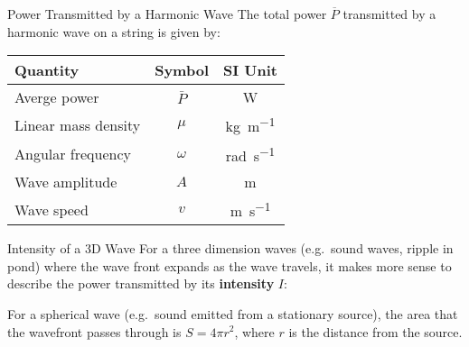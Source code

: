 \documentclass[12pt,aspectratio=169]{beamer}
\newcommand{\eq}[2]{\vspace{#1}{\Large\begin{displaymath}#2\end{displaymath}}}
\begin{document}
\begin{frame}{Power Transmitted by a Harmonic Wave}
  The total power $\overline{P}$ transmitted by a harmonic wave on a string is
  given by:

  \eq{-.2in}{
    \boxed{\overline{P}=\frac12\mu\omega^2A^2v}
  }
  \begin{center}
    \begin{tabular}{l|c|c}
      \rowcolor{pink}
      \textbf{Quantity} & \textbf{Symbol} & \textbf{SI Unit} \\ \hline
      Averge power        & $\bar{P}$ & \si\watt \\
      Linear mass density & $\mu$     & \si{\kilo\gram\per\metre}\\
      Angular frequency   & $\omega$  & \si{rad\per\second}\\
      Wave amplitude      & $A$       & \si\metre \\
      Wave speed          & $v$       & \si{\metre\per\second}
    \end{tabular}
  \end{center}  
\end{frame}



\begin{frame}{Intensity of a 3D Wave}
  For a three dimension waves (e.g.\ sound waves, ripple in pond) where the
  wave front expands as the wave travels, it makes more sense to describe the
  power transmitted by its \textbf{intensity} $I$:

  \eq{-.25in}{
    \boxed{I=\frac{\overline{P}}S}
  }

  For a spherical wave (e.g.\ sound emitted from a stationary source), the area
  that the wavefront passes through is $S=4\pi r^2$, where $r$ is the distance
  from the source.
\end{frame}
\end{document}
